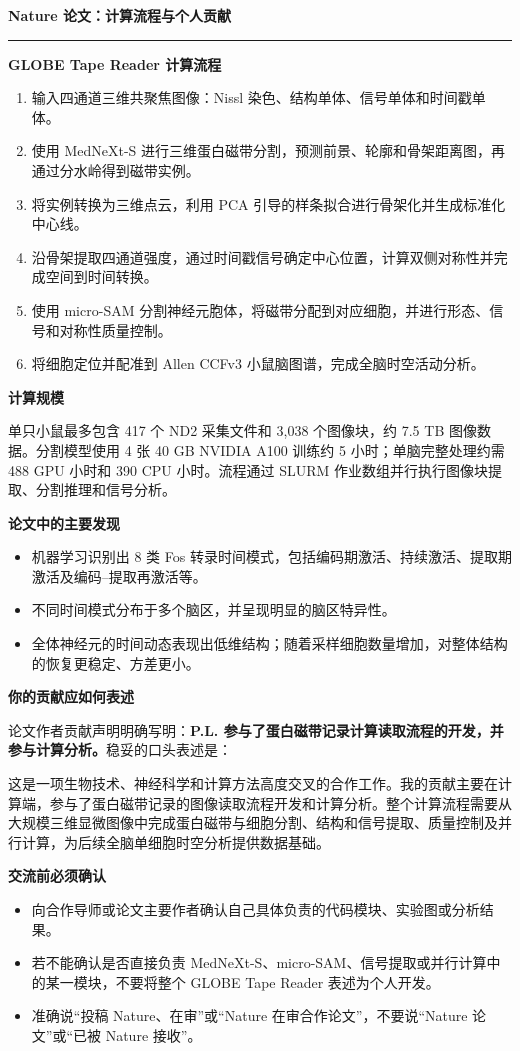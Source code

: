 \documentclass[11pt,a4paper]{ctexart}
\newcommand{\sectionbar}[1]{%
  \vspace{0.35em}
  {\large\bfseries\sffamily\color{accent} #1}\par
  \vspace{-0.35em}\color{accent}\rule{\textwidth}{0.7pt}\color{black}\vspace{0.2em}
}
\newcommand{\prompt}[1]{\textbf{\color{accent}#1}}
\newcommand{\note}[1]{%
  \begin{center}
  \colorbox{light}{\parbox{0.94\textwidth}{#1}}
  \end{center}
}
\begin{document}
\newpage
\sectionbar{Nature 论文：计算流程与个人贡献}

\begingroup
\small

\prompt{GLOBE Tape Reader 计算流程}
\begin{enumerate}
  \item 输入四通道三维共聚焦图像：Nissl 染色、结构单体、信号单体和时间戳单体。
  \item 使用 MedNeXt-S 进行三维蛋白磁带分割，预测前景、轮廓和骨架距离图，再通过分水岭得到磁带实例。
  \item 将实例转换为三维点云，利用 PCA 引导的样条拟合进行骨架化并生成标准化中心线。
  \item 沿骨架提取四通道强度，通过时间戳信号确定中心位置，计算双侧对称性并完成空间到时间转换。
  \item 使用 micro-SAM 分割神经元胞体，将磁带分配到对应细胞，并进行形态、信号和对称性质量控制。
  \item 将细胞定位并配准到 Allen CCFv3 小鼠脑图谱，完成全脑时空活动分析。
\end{enumerate}

\prompt{计算规模}

单只小鼠最多包含 417 个 ND2 采集文件和 3,038 个图像块，约 7.5 TB 图像数据。分割模型使用 4 张 40 GB NVIDIA A100 训练约 5 小时；单脑完整处理约需 488 GPU 小时和 390 CPU 小时。流程通过 SLURM 作业数组并行执行图像块提取、分割推理和信号分析。

\prompt{论文中的主要发现}
\begin{itemize}
  \item 机器学习识别出 8 类 Fos 转录时间模式，包括编码期激活、持续激活、提取期激活及编码--提取再激活等。
  \item 不同时间模式分布于多个脑区，并呈现明显的脑区特异性。
  \item 全体神经元的时间动态表现出低维结构；随着采样细胞数量增加，对整体结构的恢复更稳定、方差更小。
\end{itemize}

\prompt{你的贡献应如何表述}

论文作者贡献声明明确写明：\textbf{P.L. 参与了蛋白磁带记录计算读取流程的开发，并参与计算分析。}稳妥的口头表述是：

\note{这是一项生物技术、神经科学和计算方法高度交叉的合作工作。我的贡献主要在计算端，参与了蛋白磁带记录的图像读取流程开发和计算分析。整个计算流程需要从大规模三维显微图像中完成蛋白磁带与细胞分割、结构和信号提取、质量控制及并行计算，为后续全脑单细胞时空分析提供数据基础。}

\prompt{交流前必须确认}
\begin{itemize}
  \item 向合作导师或论文主要作者确认自己具体负责的代码模块、实验图或分析结果。
  \item 若不能确认是否直接负责 MedNeXt-S、micro-SAM、信号提取或并行计算中的某一模块，不要将整个 GLOBE Tape Reader 表述为个人开发。
  \item 准确说“投稿 Nature、在审”或“Nature 在审合作论文”，不要说“Nature 论文”或“已被 Nature 接收”。
\end{itemize}
\end{document}
